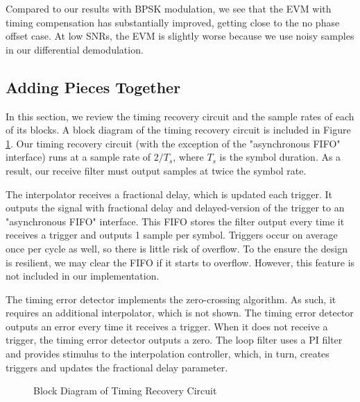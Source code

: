 \documentclass{article}
\begin{document}
Compared to our results with BPSK modulation, we see that the EVM with timing compensation has substantially improved, getting close to the no phase offset case. At low SNRs, the EVM is slightly worse because we use noisy samples in our differential demodulation.

\subsection{Adding Pieces Together}
\label{section::adding_pieces_together}

In this section, we review the timing recovery circuit and the sample rates of each of its blocks. A block diagram of the timing recovery circuit is included in Figure \ref{fig::timing_recovery_block_diagram_2}. Our timing recovery circuit (with the exception of the "asynchronous FIFO" interface) runs at a sample rate of $2/T_s$, where $T_s$ is the symbol duration. As a result, our receive filter must output samples at twice the symbol rate.

	The interpolator receives a fractional delay, which is updated each trigger. It outputs the signal with fractional delay and delayed-version of the trigger to an "asynchronous FIFO" interface. This FIFO stores the filter output every time it receives a trigger and outputs 1 sample per symbol. Triggers occur on average once per cycle as well, so there is little risk of overflow. To the ensure the design is resilient, we may clear the FIFO if it starts to overflow. However, this feature is not included in our implementation.
	
	The timing error detector implements the zero-crossing algorithm. As such, it requires an additional interpolator, which is not shown. The timing error detector outputs an error every time it receives a trigger. When it does not receive a trigger, the timing error detector outputs a zero. The loop filter uses a PI filter and provides stimulus to the interpolation controller, which, in turn, creates triggers and updates the fractional delay parameter.
	
\begin{figure}[H]
	\centerline{}
	\caption{Block Diagram of Timing Recovery Circuit}
	\label{fig::timing_recovery_block_diagram_2}
\end{figure}
\end{document}
